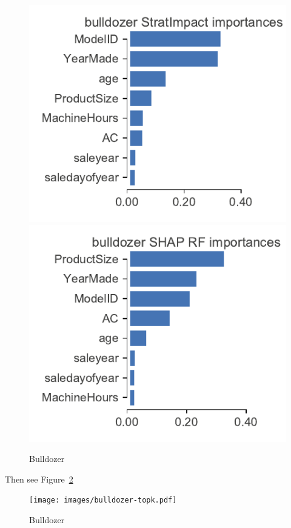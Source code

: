 \documentclass[12pt]{article}
\newcommand{\figref}[1]{Figure~\ref{#1}}
\begin{document}
\begin{figure}[htbp]
\begin{center}
\includegraphics[scale=0.6]{images/bulldozer-features.pdf}
\includegraphics[scale=0.6]{images/bulldozer-features-shap-rf.pdf}
\caption{Bulldozer}
\label{fig:bulldozer-features}
\end{center}
\end{figure}

Then see \figref{fig:bulldozer-topk}

\begin{figure}[htbp]
\begin{center}
\texttt{[image: images/bulldozer-topk.pdf]}
\caption{Bulldozer}
\label{fig:bulldozer-topk}
\end{center}
\end{figure}
\end{document}
